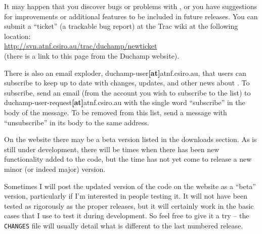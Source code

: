 It may happen that you discover bugs or problems with \duchamp, or you
have suggestions for improvements or additional features to be
included in future releases. You can submit a ``ticket'' (a trackable
bug report) at the \duchamp Trac wiki at the following location:\\
\href{http://svn.atnf.csiro.au/trac/duchamp/newticket}%
{http://svn.atnf.csiro.au/trac/duchamp/newticket}
\\(there is a link to this page from the Duchamp website).

There is also an email exploder, duchamp-user\textbf{[at]}atnf.csiro.au,
that users can subscribe to keep up to date with changes, updates, and
other news about \duchamp. To subscribe, send an email (from the
account you wish to subscribe to the list) to
duchamp-user-request\textbf{[at]}atnf.csiro.au with the single word
``subscribe'' in the body of the message. To be removed from this
list, send a message with ``unsubscribe'' in its body to the same
address.


On the \duchamp website there may be a beta version listed in the
downloads section. As \duchamp is still under development, there will
be times when there has been new functionality added to the code, but
the time has not yet come to release a new minor (or indeed major)
version. 

Sometimes I will post the updated version of the code on the website
as a ``beta'' version, particularly if I'm interested in people
testing it. It will not have been tested as rigorously as the proper
releases, but it will certainly work in the basic cases that I use to
test it during development. So feel free to give it a try -- the
\texttt{CHANGES} file will usually detail what is different to the last
numbered release.


